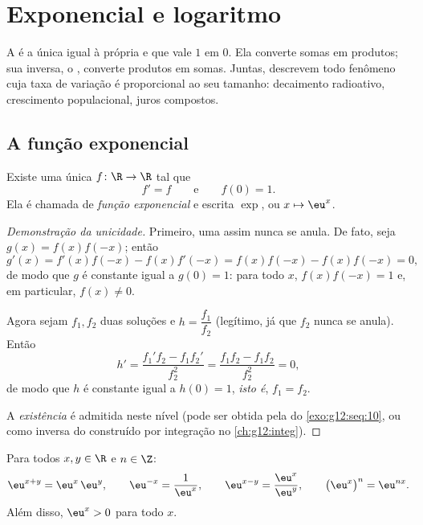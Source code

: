 \chapter{Exponencial e logaritmo}\label{ch:g12:exp}

A  é a única  igual à própria  e que vale
$1$ em $0$. Ela converte somas em produtos; sua inversa, o , converte produtos em somas. Juntas, descrevem todo fenômeno cuja
taxa de variação é proporcional ao seu tamanho: decaimento radioativo,
crescimento populacional, juros compostos.

\section{A função exponencial}

\begin{theorem}\label{thm:g12:exp:existence}
Existe uma única   $f \colon \R \to \R$ tal que
\[
f' = f \qquad\text{e}\qquad f(0) = 1 .
\]
Ela é chamada de \emph{função exponencial} e escrita
$\exp$, ou $x \mapsto \eu^x$.
\end{theorem}

\begin{proof}[Demonstração da unicidade]
Primeiro, uma  assim nunca se anula. De fato, seja
$g(x) = f(x)f(-x)$; então
\[
g'(x) = f'(x)f(-x) - f(x)f'(-x) = f(x)f(-x) - f(x)f(-x) = 0,
\]
de modo que $g$ é constante igual a $g(0) = 1$: para todo $x$,
$f(x)f(-x) = 1$ e, em particular, $f(x) \neq 0$.

Agora sejam $f_1, f_2$ duas soluções e $h = \dfrac{f_1}{f_2}$ (legítimo,
já que $f_2$ nunca se anula). Então
\[
h' = \frac{f_1' f_2 - f_1 f_2'}{f_2^2} = \frac{f_1 f_2 - f_1 f_2}{f_2^2} = 0,
\]
de modo que $h$ é constante igual a $h(0) = 1$, \emph{isto é},
$f_1 = f_2$.

A \emph{existência} é admitida neste nível (pode ser obtida pela 
do \cref{exo:g12:seq:10}, ou como inversa do  construído por
integração no \cref{ch:g12:integ}).
\end{proof}

\begin{proposition}\label{prop:g12:exp:funceq}
Para todos $x, y \in \R$ e $n \in \Z$:
\[
\eu^{x+y} = \eu^x\,\eu^y, \qquad
\eu^{-x} = \frac{1}{\eu^x}, \qquad
\eu^{x-y} = \frac{\eu^x}{\eu^y}, \qquad
\bigl(\eu^{x}\bigr)^n = \eu^{nx}.
\]
Além disso, $\eu^x > 0$ para todo $x$.
\end{proposition}

